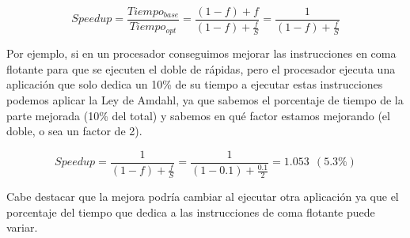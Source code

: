 \documentclass[12pt,onecolumn]{memoir}
\begin{document}
\begin{center}
\end{center}

\[ Speedup = \frac{Tiempo_{base}}{Tiempo_{opt}} = \frac{(1 - f) +
  f}{(1 - f) + \frac{f}{S}} = \frac{1}{(1 - f) + \frac{f}{S}} \]

\begin{center}
\end{center}
  
Por ejemplo, si en un procesador conseguimos mejorar las instrucciones en coma flotante para
que se ejecuten el doble de rápidas,
pero el procesador ejecuta una aplicación que solo dedica un 10\% de su tiempo a ejecutar estas
instrucciones podemos aplicar la Ley de Amdahl, ya que sabemos el
porcentaje de tiempo de la parte mejorada (10\% del total) y sabemos
en qué factor estamos mejorando (el doble, o sea un factor de 2).

\[ Speedup = \frac{1}{(1 - f) + \frac{f}{S}} = \frac{1}{(1 - 0.1) +
  \frac{0.1}{2}} = 1.053 ~ ~ (5.3\%) \]

Cabe destacar que la mejora podría cambiar al ejecutar otra aplicación
ya que el porcentaje del tiempo que dedica a las instrucciones de coma
flotante puede variar.
\end{document}
